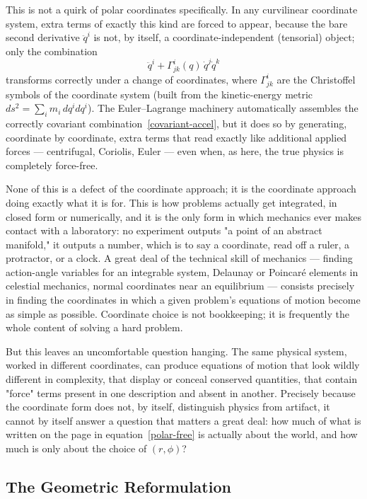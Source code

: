This is not a quirk of polar coordinates specifically. In any
curvilinear coordinate system, extra terms of exactly this kind are
forced to appear, because the bare second derivative $\ddot q^i$ is
not, by itself, a coordinate-independent (tensorial) object; only the
combination
\begin{equation}
  \ddot q^i + \Gamma^i_{jk}(q)\,\dot q^j\dot q^k
  \label{covariant-accel}
\end{equation}
transforms correctly under a change of coordinates, where $\Gamma^i_{jk}$ are
the Christoffel symbols of the coordinate system (built from the kinetic-energy
metric $ds^2 = \sum_i m_i\,dq^i dq^i$). The Euler--Lagrange machinery
automatically assembles the correctly covariant
combination~\eqref{covariant-accel}, but it does so by generating, coordinate
by coordinate, extra terms that read exactly like additional applied forces ---
centrifugal, Coriolis, Euler --- even when, as here, the true physics is
completely force-free.

None of this is a defect of the coordinate approach; it is the
coordinate approach doing exactly what it is for. This is how
problems actually get integrated, in closed form or numerically, and
it is the only form in which mechanics ever makes contact with a
laboratory: no experiment outputs "a point of an abstract manifold,"
it outputs a number, which is to say a coordinate, read off a ruler,
a protractor, or a clock. A great deal of the technical skill of
mechanics --- finding action-angle variables for an integrable
system, Delaunay or Poincar\'e elements in celestial mechanics,
normal coordinates near an equilibrium --- consists precisely in
finding the coordinates in which a given problem's equations of
motion become as simple as possible. Coordinate choice is not
bookkeeping; it is frequently the whole content of solving a hard
problem.

But this leaves an uncomfortable question hanging. The same physical
system, worked in different coordinates, can produce equations of
motion that look wildly different in complexity, that display or
conceal conserved quantities, that contain "force" terms present in
one description and absent in another. Precisely because the
coordinate form does not, by itself, distinguish physics from
artifact, it cannot by itself answer a question that matters a great
deal: how much of what is written on the page in
equation~\eqref{polar-free} is actually about the world, and how
much is only about the choice of $(r,\phi)$?

\subsection{The Geometric Reformulation}

